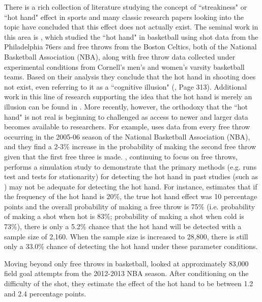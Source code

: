 \documentclass[letterpaper,12pt]{article}\usepackage[]{graphicx}\usepackage[]{color}
\begin{document}
There is a rich collection of literature studying the concept of ``streakiness" or ``hot hand" effect in sports and many classic research papers looking into the topic have concluded that this effect does not actually exist.  The seminal work in this area is \cite{Gilovich1985}, which studied the ``hot hand" in basketball using shot data from the Philadelphia 76ers and free throws from the Boston Celtics, both of the National Basketball Association (NBA), along with free throw data collected under experimental conditions from Cornell's men's and women's varsity basketball teams.  Based on their analysis they conclude that the hot hand in shooting does not exist, even referring to it as a ``cognitive illusion" (\cite{Gilovich1985}, Page 313).  Additional work in this line of research supporting the idea that the hot hand is merely an illusion can be found in \cite{HuizingaWeil2009,TverskyGilovich1989,KoehlerConley2003}.  More recently, however, the orthodoxy that the ``hot hand" is not real is beginning to challenged as access to newer and larger data becomes available to researchers.  For example, \cite{Arkes2010} uses data from every free throw occurring in the 2005-06 season of the National Basketball Association (NBA),  and they find a 2-3\% increase in the probability of making the second free throw given that the first free three is made. \cite{Arkes2013}, continuing to focus on free throws, performs a simulation study to demonstrate that the primary methods (e.g. runs test and tests for stationarity) for detecting the hot hand in past studies (such as \cite{HuizingaWeil2009,Gilovich1985,TverskyGilovich1989,KoehlerConley2003}) may not be adequate for detecting the hot hand.  For instance, \cite{Arkes2013} estimates that if the frequency of the hot hand is 20\%, the true hot hand effect was 10 percentage points and the overall probability of making a free throw is 75\% (i.e. probability of making a shot when hot is 83\%; probability of making a shot when cold is 73\%), there is only a 5.2\% chance that the hot hand will be detected with a sample size of 2,160.  When the sample size is increased to 28,800, there is still only a 33.0\% chance of detecting the hot hand under these parameter conditions.  

Moving beyond only free throws in basketball, \cite{BocskocskyEtAl2014} looked at approximately 83,000 field goal attempts from the 2012-2013 NBA season.  After conditioning on the difficulty of the shot, they estimate the effect of the hot hand to be between 1.2 and 2.4 percentage points. 
\end{document}
